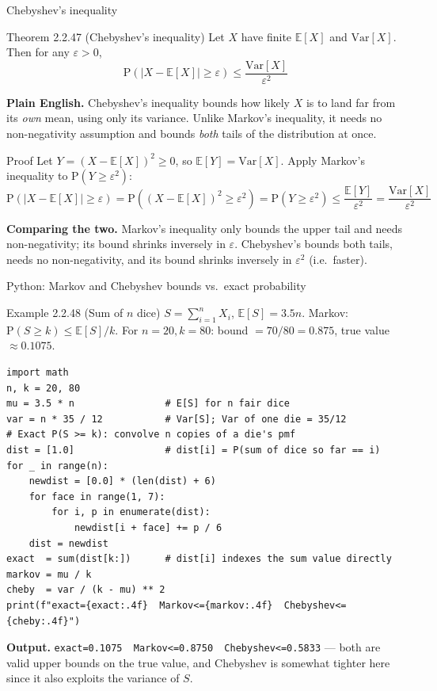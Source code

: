 \documentclass[aspectratio=169,10pt]{beamer}
\begin{document}
\begin{frame}{Chebyshev's inequality}
\begin{block}{Theorem 2.2.47 (Chebyshev's inequality)}
Let $X$ have finite $\mathbb{E}[X]$ and $\mathrm{Var}[X]$. Then for any
$\varepsilon>0$,
\[ \mathrm{P}(|X-\mathbb{E}[X]|\geq\varepsilon) \leq \frac{\mathrm{Var}[X]}{\varepsilon^2} \]
\end{block}
\textbf{Plain English.} Chebyshev's inequality bounds how likely $X$ is to
land far from its \emph{own} mean, using only its variance. Unlike Markov's
inequality, it needs no non-negativity assumption and bounds \emph{both}
tails of the distribution at once.

\begin{block}{Proof}
Let $Y=(X-\mathbb{E}[X])^2\geq 0$, so $\mathbb{E}[Y]=\mathrm{Var}[X]$. Apply
Markov's inequality to $\mathrm{P}(Y\geq\varepsilon^2)$:
\[ \mathrm{P}(|X-\mathbb{E}[X]|\geq\varepsilon) = \mathrm{P}((X-\mathbb{E}[X])^2\geq\varepsilon^2)
= \mathrm{P}(Y\geq\varepsilon^2) \leq \frac{\mathbb{E}[Y]}{\varepsilon^2} = \frac{\mathrm{Var}[X]}{\varepsilon^2} \]
\end{block}
\textbf{Comparing the two.} Markov's inequality only bounds the upper tail
and needs non-negativity; its bound shrinks inversely in $\varepsilon$.
Chebyshev's bounds both tails, needs no non-negativity, and its bound
shrinks inversely in $\varepsilon^2$ (i.e.\ faster).
\end{frame}

\begin{frame}[fragile]{Python: Markov and Chebyshev bounds vs.\ exact probability}
\begin{block}{Example 2.2.48 (Sum of $n$ dice)}
$S=\sum_{i=1}^n X_i$, $\mathbb{E}[S]=3.5n$. Markov: $\mathrm{P}(S\geq k)\leq \mathbb{E}[S]/k$.
For $n=20,k=80$: bound $=70/80=0.875$, true value $\approx0.1075$.
\end{block}
\begin{lstlisting}
import math
n, k = 20, 80
mu = 3.5 * n                # E[S] for n fair dice
var = n * 35 / 12           # Var[S]; Var of one die = 35/12
# Exact P(S >= k): convolve n copies of a die's pmf
dist = [1.0]                # dist[i] = P(sum of dice so far == i)
for _ in range(n):
    newdist = [0.0] * (len(dist) + 6)
    for face in range(1, 7):
        for i, p in enumerate(dist):
            newdist[i + face] += p / 6
    dist = newdist
exact  = sum(dist[k:])      # dist[i] indexes the sum value directly
markov = mu / k
cheby  = var / (k - mu) ** 2
print(f"exact={exact:.4f}  Markov<={markov:.4f}  Chebyshev<={cheby:.4f}")
\end{lstlisting}
\textbf{Output.} \texttt{exact=0.1075\ \ Markov<=0.8750\ \ Chebyshev<=0.5833}
--- both are valid upper bounds on the true value, and Chebyshev is somewhat
tighter here since it also exploits the variance of $S$.
\end{frame}
\end{document}

